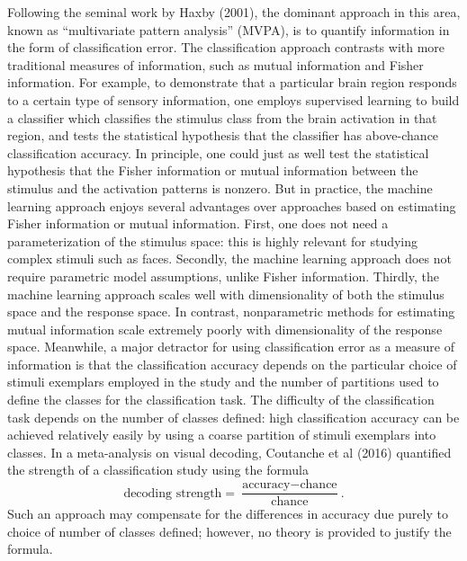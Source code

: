 \documentclass[12pt]{article}
\begin{document}
Following the seminal work by Haxby (2001), the dominant approach in
this area, known as ``multivariate pattern analysis'' (MVPA), is to
quantify information in the form of classification error.  The
classification approach contrasts with more traditional measures of
information, such as mutual information and Fisher information.  For
example, to demonstrate that a particular brain region responds to a
certain type of sensory information, one employs supervised learning
to build a classifier which classifies the stimulus class from the
brain activation in that region, and tests the statistical hypothesis
that the classifier has above-chance classification accuracy.  In
principle, one could just as well test the statistical hypothesis that
the Fisher information or mutual information between the stimulus and
the activation patterns is nonzero.  But in practice, the machine
learning approach enjoys several advantages over approaches based on
estimating Fisher information or mutual information.  First, one does
not need a parameterization of the stimulus space: this is highly
relevant for studying complex stimuli such as faces.  Secondly, the
machine learning approach does not require parametric model
assumptions, unlike Fisher information.  Thirdly, the machine learning
approach scales well with dimensionality of both the stimulus space
and the response space.  In contrast, nonparametric methods for
estimating mutual information scale extremely poorly with
dimensionality of the response space.  Meanwhile, a major detractor
for using classification error as a measure of information is that the
classification accuracy depends on the particular choice of stimuli
exemplars employed in the study and the number of partitions used to
define the classes for the classification task.  The difficulty of the
classification task depends on the number of classes defined: high
classification accuracy can be achieved relatively easily by using a
coarse partition of stimuli exemplars into classes.  In a
meta-analysis on visual decoding, Coutanche et al (2016) quantified
the strength of a classification study using the formula
\[
\text{decoding strength} = \frac{\text{accuracy} - \text{chance}}{\text{chance}}.
\]
Such an approach may compensate for the differences in accuracy due purely to choice of number of classes defined;
however, no theory is provided to justify the formula.
\end{document}
